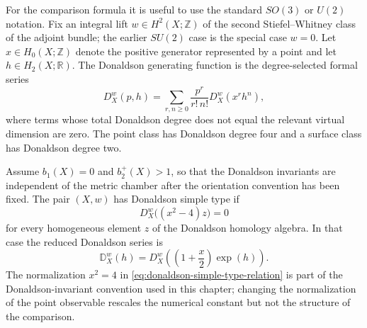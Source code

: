 For the comparison formula it is useful to use the standard \(SO(3)\) or
\(U(2)\) notation.  Fix an integral lift \(w\in H^2(X;\mathbb Z)\) of the
second Stiefel--Whitney class of the adjoint bundle; the earlier \(SU(2)\)
case is the special case \(w=0\).  Let \(x\in H_0(X;\mathbb Z)\) denote the
positive generator represented by a point and let \(h\in H_2(X;\mathbb R)\).
The Donaldson generating function is the degree-selected formal series
\begin{equation}
  D_X^w(p,h)
  =
  \sum_{r,n\ge0}
  \frac{p^r}{r!\,n!}
  D_X^w(x^rh^n),
  \label{eq:donaldson-generating-function}
\end{equation}
where terms whose total Donaldson degree does not equal the relevant virtual
dimension are zero.  The point class has Donaldson degree four and a surface
class has Donaldson degree two.

\begin{definition}
\label{def:donaldson-simple-type-series}
Assume \(b_1(X)=0\) and \(b_2^+(X)>1\), so that the Donaldson invariants are
independent of the metric chamber after the orientation convention has been
fixed.  The pair \((X,w)\) has Donaldson simple type if
\begin{equation}
  D_X^w\bigl((x^2-4)z\bigr)=0
  \label{eq:donaldson-simple-type-relation}
\end{equation}
for every homogeneous element \(z\) of the Donaldson homology algebra.  In
that case the reduced Donaldson series is
\begin{equation}
  \mathbb D_X^w(h)
  =
  D_X^w\left(\left(1+\frac{x}{2}\right)\exp(h)\right).
  \label{eq:reduced-donaldson-series}
\end{equation}
The normalization \(x^2=4\) in
\eqref{eq:donaldson-simple-type-relation} is part of the Donaldson-invariant
convention used in this chapter; changing the normalization of the point
observable rescales the numerical constant but not the structure of the
comparison.
\end{definition}

